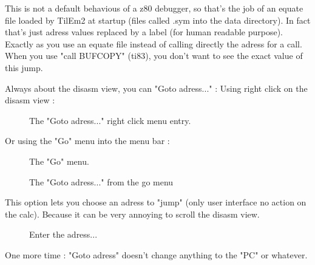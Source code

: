 \documentclass[10pt]{report}
\begin{document}
This is not a default behavious of a z80 debugger, so that's the job of an equate file loaded by TilEm2 at startup (files called .sym into the data directory).\newline
In fact that's just adress values replaced by a label (for human readable purpose).\newline
Exactly as you use an equate file instead of calling directly the adress for a call.\newline
When you use "call BUFCOPY" (ti83), you don't want to see the exact value of this jump.\newline

Always about the disasm view, you can "Goto adress..." : \newline
Using right click on the disasm view : \newline
\begin{figure}[H]
\centering
{}
\caption{The "Goto adress..." right click menu entry.}
\end{figure}

Or using the "Go" menu into the menu bar :\newline
\begin{figure}[H]
\centering
{}
\caption{The "Go" menu.}
\end{figure}

\begin{figure}[H]
\centering
{}
\caption{The "Goto adress..." from the go menu}
\end{figure}

This option lets you choose an adress to "jump" (only user interface no action on the calc).\newline
Because it can be very annoying to scroll the disasm view.\newline

\begin{figure}[H]
\centering
{}
\caption{Enter the adress...}
\end{figure}
One more time : "Goto adress" doesn't change anything to the "PC" or whatever.\newline 
\end{document}
